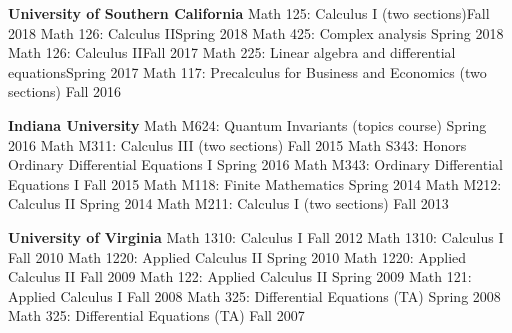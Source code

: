 \documentclass[12pt]{amsart}
\renewcommand{\j}{\indent}
\renewcommand{\v}{\vskip5pt }
\newcommand{\w}{\vskip5pt}
\begin{document}
\textbf{University of Southern California}\w
\j Math 125: Calculus I (two sections)\hfill Fall 2018\w
\j Math 126: Calculus II\hfill Spring 2018\w
\j Math 425:  Complex analysis \hfill Spring 2018\w
\j Math 126: Calculus II\hfill Fall 2017\w
\j Math 225: Linear algebra and differential equations\hfill Spring 2017\w
\j Math 117: Precalculus for Business and Economics (two sections) \hfill Fall 2016\w

\textbf{Indiana University}\w
\j Math M624: Quantum Invariants (topics course) \hfill Spring 2016\w
\j Math M311: Calculus III (two sections) \hfill Fall 2015\w
\j Math S343: Honors Ordinary Differential Equations I \hfill Spring 2016\w
\j Math M343: Ordinary Differential Equations I \hfill Fall 2015\w
\j Math M118: Finite Mathematics \hfill Spring 2014\w
\j Math M212: Calculus  II \hfill  Spring 2014\w
\j Math M211: Calculus I (two sections) \hfill Fall 2013\w

\textbf{University of Virginia}\w
\j  Math 1310: Calculus I \hfill Fall 2012\w
\j  Math 1310: Calculus I \hfill Fall 2010\w
\j  Math 1220: Applied Calculus II \hfill Spring 2010\w
\j  Math 1220: Applied Calculus II \hfill Fall 2009\w
\j Math 122: Applied Calculus II \hfill  Spring 2009\w
\j Math 121: Applied Calculus I \hfill  Fall 2008\w
\j Math 325: Differential Equations (TA) \hfill Spring 2008\w
\j Math 325: Differential Equations (TA) \hfill Fall 2007\vskip5pt

\v
\end{document}
